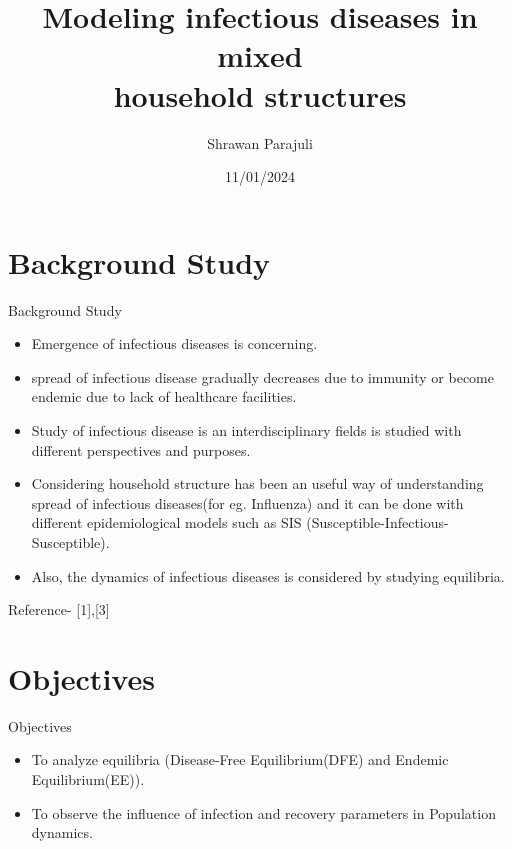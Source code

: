 \documentclass[smaller,aspectratio=169, toc=bibliography]{beamer}
\begin{document}
\title[Modeling infectious diseases in mixed household structures]{Modeling infectious diseases in mixed \\ household structures}
\author{Shrawan Parajuli}
\date{11/01/2024}



\begin{frame}

\titlepage
\end{frame}


\begin{frame}{\contentsname}
\tableofcontents
\end{frame}

\section{Background Study}
\begin{frame}[fragile]{Background Study}
\begin{itemize}
\item Emergence of infectious diseases is concerning. 
\item spread of infectious disease gradually decreases due to immunity or become endemic due to lack of healthcare facilities. 
\item Study of infectious disease is an interdisciplinary fields is studied with different perspectives and purposes.
\item Considering household structure has been an useful way of understanding spread of infectious diseases(for eg. Influenza) and it can be done with different epidemiological models such as  SIS (Susceptible-Infectious-Susceptible). 
\item Also, the dynamics of infectious diseases is considered by studying equilibria. 
\end{itemize}
\tiny{Reference- [1],[3]}
\end{frame}

\section{Objectives}
\begin{frame}[fragile]{Objectives}
\begin{itemize}
\item To analyze equilibria (Disease-Free Equilibrium(DFE) and Endemic Equilibrium(EE)).  
\item To observe the influence of infection and recovery parameters in Population dynamics. 
\end{itemize}
\end{frame}
\end{document}
